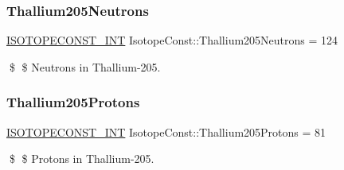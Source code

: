 \subsubsection{\texorpdfstring{Thallium205\+Neutrons}{Thallium205Neutrons}}
{\footnotesize\ttfamily \mbox{\hyperlink{group___isotope_const-_macros_ga5f18360b3e99483a35c32d789e62621c}{I\+S\+O\+T\+O\+P\+E\+C\+O\+N\+S\+T\+\_\+\+I\+NT}} Isotope\+Const\+::\+Thallium205\+Neutrons = 124}

\$ \$ Neutrons in Thallium-\/205. \mbox{\label{group___isotope_const-_thallium-_tl205_gad45f8a90493c7c2ed9a5da78013fe63d}} 
\subsubsection{\texorpdfstring{Thallium205\+Protons}{Thallium205Protons}}
{\footnotesize\ttfamily \mbox{\hyperlink{group___isotope_const-_macros_ga5f18360b3e99483a35c32d789e62621c}{I\+S\+O\+T\+O\+P\+E\+C\+O\+N\+S\+T\+\_\+\+I\+NT}} Isotope\+Const\+::\+Thallium205\+Protons = 81}

\$ \$ Protons in Thallium-\/205. 